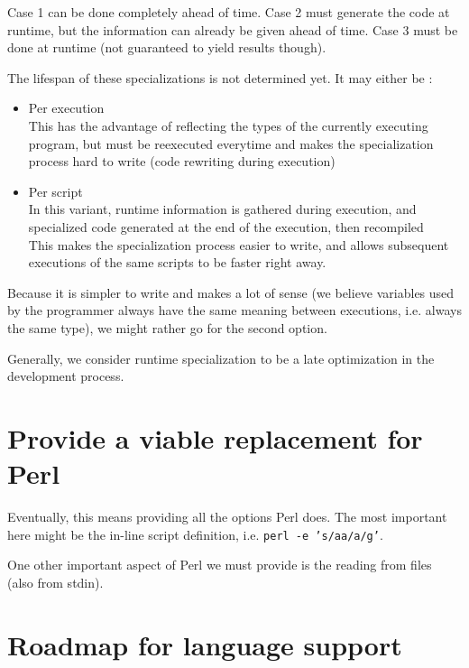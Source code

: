 \documentclass[11pt,a4paper]{report}
\newcommand{\pgl}[1]{\textsf{#1}}
\newcommand{\bash}[1]{\texttt{#1}}
\begin{document}
Case 1 can be done completely ahead of time. Case 2 must generate the code at runtime, but the information can already be given ahead of time. Case 3 must be done at runtime (not guaranteed to yield results though).

The lifespan of these specializations is not determined yet. It may either be :
\begin{itemize}
\item Per execution \\
This has the advantage of reflecting the types of the currently executing program, but must be reexecuted everytime and makes the specialization process hard to write (code rewriting during execution)
\item Per script \\
In this variant, runtime information is gathered during execution, and specialized code generated at the end of the execution, then recompiled\\
This makes the specialization process easier to write, and allows subsequent executions of the same scripts to be faster right away.
\end{itemize}

Because it is simpler to write and makes a lot of sense (we believe variables used by the programmer always have the same meaning between executions, i.e. always the same type), we might rather go for the second option.

Generally, we consider runtime specialization to be a late optimization in the development process.

\section{Provide a viable replacement for Perl}

Eventually, this means providing all the options \pgl{Perl} does. The most important here might be the in-line script definition, i.e. \bash{perl -e 's/aa/a/g'}.

One other important aspect of \pgl{Perl} we must provide is the reading from files (also from stdin).

\section{Roadmap for language support}
\end{document}
